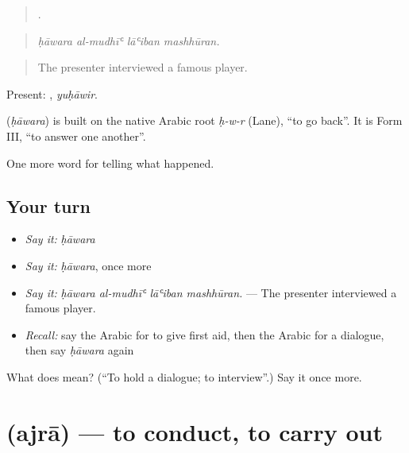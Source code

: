 \begin{quote}
   .
\end{quote}

\begin{quote}
\emph{ḥāwara al-mudhīʿ lāʿiban mashhūran.}
\end{quote}

\begin{quote}
The presenter interviewed a famous player.
\end{quote}

Present: , \emph{yuḥāwir}.

\begin{cousinweb}
\textbf{} (\emph{ḥāwara}) is built on the native Arabic root \emph{ḥ-w-r} (Lane), \textquotedblleft{}to go back\textquotedblright{}. It is Form III, \textquotedblleft{}to answer one another\textquotedblright{}.
\end{cousinweb}

\begin{grammarlens}[title={What you've built}]
One more word for telling what happened.
\end{grammarlens}

\subsection*{Your turn}
\begin{itemize}
\raggedright
  \item \emph{Say it:} \emph{ḥāwara}
  \item \emph{Say it:} \emph{ḥāwara}, once more
  \item \emph{Say it:} \emph{ḥāwara al-mudhīʿ lāʿiban mashhūran.} — The presenter interviewed a famous player.
  \item \emph{Recall:} say the Arabic for to give first aid, then the Arabic for a dialogue, then say \emph{ḥāwara} again
\end{itemize}

\begin{tcolorbox}[breakable,colback=teal!4,colframe=teal!35!black,title={Before you move on}]
What does  mean? (\textquotedblleft{}To hold a dialogue; to interview\textquotedblright{}.) Say it once more.
\end{tcolorbox}
\section[\texorpdfstring{\ar{أجرى} (ajrā)}{أجرى (ajrā)}]{ (ajrā) — to conduct, to carry out}

